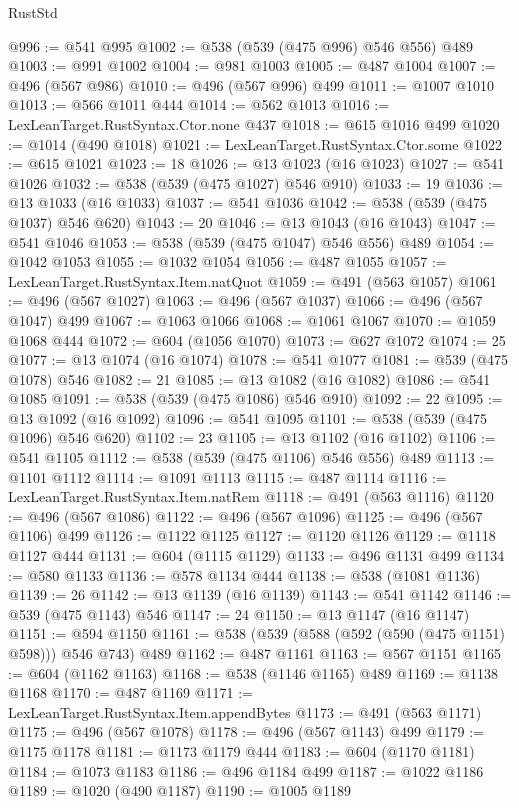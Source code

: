 \begin{lexlean}{RustStd}
\begin{coremodule}
@996 := @541 @995
@1002 := @538 (@539 (@475 @996) @546 @556) @489
@1003 := @991 @1002
@1004 := @981 @1003
@1005 := @487 @1004
@1007 := @496 (@567 @986)
@1010 := @496 (@567 @996) @499
@1011 := @1007 @1010
@1013 := @566 @1011 @444
@1014 := @562 @1013
@1016 := LexLeanTarget.RustSyntax.Ctor.none @437
@1018 := @615 @1016 @499
@1020 := @1014 (@490 @1018)
@1021 := LexLeanTarget.RustSyntax.Ctor.some
@1022 := @615 @1021
@1023 := 18
@1026 := @13 @1023 (@16 @1023)
@1027 := @541 @1026
@1032 := @538 (@539 (@475 @1027) @546 @910)
@1033 := 19
@1036 := @13 @1033 (@16 @1033)
@1037 := @541 @1036
@1042 := @538 (@539 (@475 @1037) @546 @620)
@1043 := 20
@1046 := @13 @1043 (@16 @1043)
@1047 := @541 @1046
@1053 := @538 (@539 (@475 @1047) @546 @556) @489
@1054 := @1042 @1053
@1055 := @1032 @1054
@1056 := @487 @1055
@1057 := LexLeanTarget.RustSyntax.Item.natQuot
@1059 := @491 (@563 @1057)
@1061 := @496 (@567 @1027)
@1063 := @496 (@567 @1037)
@1066 := @496 (@567 @1047) @499
@1067 := @1063 @1066
@1068 := @1061 @1067
@1070 := @1059 @1068 @444
@1072 := @604 (@1056 @1070)
@1073 := @627 @1072
@1074 := 25
@1077 := @13 @1074 (@16 @1074)
@1078 := @541 @1077
@1081 := @539 (@475 @1078) @546
@1082 := 21
@1085 := @13 @1082 (@16 @1082)
@1086 := @541 @1085
@1091 := @538 (@539 (@475 @1086) @546 @910)
@1092 := 22
@1095 := @13 @1092 (@16 @1092)
@1096 := @541 @1095
@1101 := @538 (@539 (@475 @1096) @546 @620)
@1102 := 23
@1105 := @13 @1102 (@16 @1102)
@1106 := @541 @1105
@1112 := @538 (@539 (@475 @1106) @546 @556) @489
@1113 := @1101 @1112
@1114 := @1091 @1113
@1115 := @487 @1114
@1116 := LexLeanTarget.RustSyntax.Item.natRem
@1118 := @491 (@563 @1116)
@1120 := @496 (@567 @1086)
@1122 := @496 (@567 @1096)
@1125 := @496 (@567 @1106) @499
@1126 := @1122 @1125
@1127 := @1120 @1126
@1129 := @1118 @1127 @444
@1131 := @604 (@1115 @1129)
@1133 := @496 @1131 @499
@1134 := @580 @1133
@1136 := @578 @1134 @444
@1138 := @538 (@1081 @1136)
@1139 := 26
@1142 := @13 @1139 (@16 @1139)
@1143 := @541 @1142
@1146 := @539 (@475 @1143) @546
@1147 := 24
@1150 := @13 @1147 (@16 @1147)
@1151 := @594 @1150
@1161 := @538 (@539 (@588 (@592 (@590 (@475 @1151) @598))) @546 @743) @489
@1162 := @487 @1161
@1163 := @567 @1151
@1165 := @604 (@1162 @1163)
@1168 := @538 (@1146 @1165) @489
@1169 := @1138 @1168
@1170 := @487 @1169
@1171 := LexLeanTarget.RustSyntax.Item.appendBytes
@1173 := @491 (@563 @1171)
@1175 := @496 (@567 @1078)
@1178 := @496 (@567 @1143) @499
@1179 := @1175 @1178
@1181 := @1173 @1179 @444
@1183 := @604 (@1170 @1181)
@1184 := @1073 @1183
@1186 := @496 @1184 @499
@1187 := @1022 @1186
@1189 := @1020 (@490 @1187)
@1190 := @1005 @1189

\end{coremodule}
\end{lexlean}
